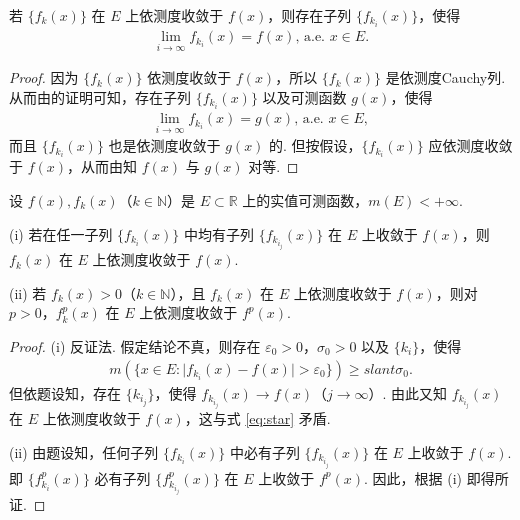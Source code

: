 \documentclass[../../main.tex]{subfiles}
\begin{document}
\begin{theorem}[Riesz(里斯)定理]\label{theorem:Riesz定理}
若 $\{f_k(x)\}$ 在 $E$ 上依测度收敛于 $f(x)$，则存在子列 $\{f_{k_i}(x)\}$，使得
\begin{align*}
\lim_{i\to\infty}f_{k_i}(x)=f(x),\, \text{a.e. }x\in E.
\end{align*}
\end{theorem}
\begin{proof}
因为 $\{f_k(x)\}$ 依测度收敛于 $f(x)$，所以 $\{f_k(x)\}$ 是依测度Cauchy列. 从而由的证明可知，存在子列 $\{f_{k_i}(x)\}$ 以及可测函数 $g(x)$，使得
\begin{align*}
\lim_{i\to\infty}f_{k_i}(x)=g(x),\,\text{a.e. }x\in E,
\end{align*}
而且 $\{f_{k_i}(x)\}$ 也是依测度收敛于 $g(x)$ 的. 但按假设，$\{f_{k_i}(x)\}$ 应依测度收敛于 $f(x)$，从而由知 $f(x)$ 与 $g(x)$ 对等. 
\end{proof}

\begin{example}
设 $f(x),f_k(x)$（$k\in\mathbb{N}$）是 $E\subset\mathbb{R}$ 上的实值可测函数，$m(E)<+\infty$.

(i) 若在任一子列 $\{f_{k_i}(x)\}$ 中均有子列 $\{f_{k_{i_j}}(x)\}$ 在 $E$ 上收敛于 $f(x)$，则 $f_k(x)$ 在 $E$ 上依测度收敛于 $f(x)$.

(ii) 若 $f_k(x)>0$（$k\in\mathbb{N}$），且 $f_k(x)$ 在 $E$ 上依测度收敛于 $f(x)$，则对 $p>0$，$f_k^p(x)$ 在 $E$ 上依测度收敛于 $f^p(x)$.
\end{example}
\begin{proof}
(i) 反证法. 假定结论不真，则存在 $\varepsilon_0>0$，$\sigma_0>0$ 以及 $\{k_i\}$，使得
\begin{align}
m(\{x\in E:\vert f_{k_i}(x)-f(x)\vert>\varepsilon_0\})\geqslant slant\sigma_0.\label{eq:star}
\end{align}
但依题设知，存在 $\{k_{i_j}\}$，使得 $f_{k_{i_j}}(x)\to f(x)$（$j\to\infty$）. 由此又知 $f_{k_{i_j}}(x)$ 在 $E$ 上依测度收敛于 $f(x)$，这与式 \eqref{eq:star} 矛盾.

(ii) 由题设知，任何子列 $\{f_{k_i}(x)\}$ 中必有子列 $\{f_{k_{i_j}}(x)\}$ 在 $E$ 上收敛于 $f(x)$. 即 $\{f_{k_i}^p(x)\}$ 必有子列 $\{f_{k_{i_j}}^p(x)\}$ 在 $E$ 上收敛于 $f^p(x)$. 因此，根据 (i) 即得所证. 
\end{proof}
\end{document}
